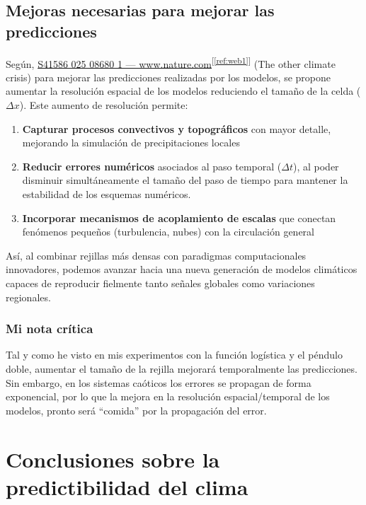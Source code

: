 \documentclass[
  10pt,
  a4paper,
  DIV=11,
  numbers=noendperiod,
  open=any]{scrreprt}
\providecommand{\tightlist}{%
  \setlength{\itemsep}{0pt}\setlength{\parskip}{0pt}}
\numberwithin{equation}{chapter}
\numberwithin{equation}{section}
\renewcommand{\[}{\begin{equation}}
\renewcommand{\]}{\end{equation}}
\newcommand{\refweb}[3]{%
  \href{#1}{#2}\textsuperscript{[\ref{ref:#3}]}%
}
\begin{document}
\section{Mejoras necesarias para mejorar las predicciones}\label{mejoras-necesarias-rejillas-muxe1s-densas-y-avances-computacionales}

Según, \refweb{https://www.nature.com/articles/s41586-025-08680-1}{S41586 025 08680 1 — www.nature.com}{web1} (The
other climate crisis) para mejorar las predicciones realizadas por los
modelos, se propone aumentar la resolución espacial de los modelos
reduciendo el tamaño de la celda (\(\Delta x\)). Este aumento de
resolución permite:

\begin{enumerate}
\def\labelenumi{\arabic{enumi}.}
\tightlist
\item
  \textbf{Capturar procesos convectivos y topográficos} con mayor
  detalle, mejorando la simulación de precipitaciones locales\\
\item
  \textbf{Reducir errores numéricos} asociados al paso temporal
  (\(\Delta t\)), al poder disminuir simultáneamente el tamaño del paso
  de tiempo para mantener la estabilidad de los esquemas numéricos.\\
\item
  \textbf{Incorporar mecanismos de acoplamiento de escalas} que conectan
  fenómenos pequeños (turbulencia, nubes) con la circulación general
\end{enumerate}

Así, al combinar rejillas más densas con paradigmas computacionales
innovadores, podemos avanzar hacia una nueva generación de modelos
climáticos capaces de reproducir fielmente tanto señales globales como
variaciones regionales.

\subsection{Mi nota crítica}\label{mi-nota-cruxedtica}

Tal y como he visto en mis experimentos con la función logística y el
péndulo doble, aumentar el tamaño de la rejilla mejorará temporalmente
las predicciones. Sin embargo, en los sistemas caóticos los errores se
propagan de forma exponencial, por lo que la mejora en la resolución
espacial/temporal de los modelos, pronto será ``comida'' por la
propagación del error.


\chapter{Conclusiones sobre la predictibilidad del
clima}\label{conclusiones-sobre-la-predictibilidad-del-clima}
\end{document}
